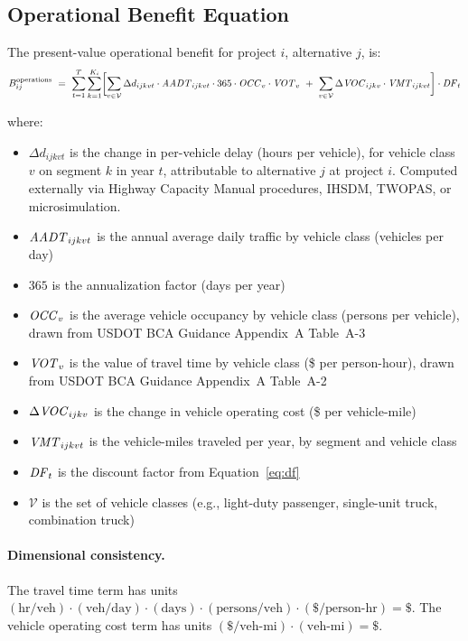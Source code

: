 \subsection{Operational Benefit Equation}

The present-value operational benefit for project $i$, alternative $j$, is:
\begin{equation}
\Bops_{ij}\ =\ \sum_{t=1}^{T}\sum_{k=1}^{K_i} \biggl[
  \sum_{v \in \mathcal{V}} \Delta d_{ijkvt} \cdot \AADT_{ijkvt} \cdot 365 \cdot \OCC_v \cdot \VOT_v
  \ +\ \sum_{v \in \mathcal{V}} \Delta\VOC_{ijkv} \cdot \VMT_{ijkvt}
\biggr] \cdot \DF_t
\label{eq:ops-benefit}
\end{equation}

\noindent where:
\begin{itemize}[leftmargin=2em, itemsep=2pt]
  \item $\Delta d_{ijkvt}$ is the change in per-vehicle delay (hours per
    vehicle), for vehicle class $v$ on segment $k$ in year $t$, attributable
    to alternative $j$ at project $i$. Computed externally via Highway
    Capacity Manual procedures, IHSDM, TWOPAS, or microsimulation.
  \item $\mathit{AADT}_{ijkvt}$ is the annual average daily traffic by vehicle class
    (vehicles per day)
  \item $365$ is the annualization factor (days per year)
  \item $\mathit{OCC}_v$ is the average vehicle occupancy by vehicle class (persons
    per vehicle), drawn from USDOT BCA Guidance Appendix~A Table~A-3
  \item $\mathit{VOT}_v$ is the value of travel time by vehicle class (\$ per
    person-hour), drawn from USDOT BCA Guidance Appendix~A Table~A-2
  \item $\Delta\mathit{VOC}_{ijkv}$ is the change in vehicle operating cost (\$ per
    vehicle-mile)
  \item $\mathit{VMT}_{ijkvt}$ is the vehicle-miles traveled per year, by segment and
    vehicle class
  \item $\mathit{DF}_t$ is the discount factor from Equation~\ref{eq:df}
  \item $\mathcal{V}$ is the set of vehicle classes (e.g., light-duty
    passenger, single-unit truck, combination truck)
\end{itemize}

\paragraph{Dimensional consistency.} The travel time term has units
$(\text{hr}/\text{veh}) \cdot (\text{veh}/\text{day}) \cdot (\text{days}) \cdot (\text{persons}/\text{veh}) \cdot (\$/\text{person-hr}) = \$$.
The vehicle operating cost term has units
$(\$/\text{veh-mi}) \cdot (\text{veh-mi}) = \$$.

